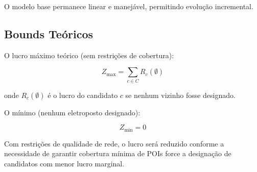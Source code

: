 O modelo base permanece linear e manejável, permitindo evolução incremental.

\subsection{Bounds Teóricos}

O lucro máximo teórico (sem restrições de cobertura):

\begin{equation}
Z_{\max} = \sum_{c \in C} R_c(\emptyset)
\end{equation}

onde $R_c(\emptyset)$ é o lucro do candidato $c$ se nenhum vizinho fosse designado.

O mínimo (nenhum eletroposto designado):

\begin{equation}
Z_{\min} = 0
\end{equation}

Com restrições de qualidade de rede, o lucro será reduzido conforme a necessidade de garantir cobertura mínima de POIs force a designação de candidatos com menor lucro marginal.
